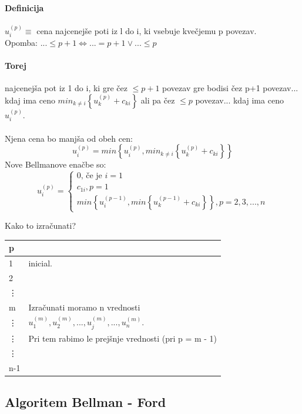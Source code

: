 \documentclass[a4paper,10pt]{article}
\begin{document}
\paragraph{Definicija}
$u_i^{(p)} \equiv$ cena najcenej\v se poti iz l do i, ki vsebuje kve\v cjemu p povezav.\\
Opomba: $... \leq p + 1 \Leftrightarrow ...= p + 1 \vee ... \leq p$

\paragraph{Torej} najcenej\v sa pot iz 1 do i, ki gre \v cez $\leq p + 1$ povezav gre bodisi \v cez p+1 povezav... kdaj ima ceno $min_{k \neq i} \left\lbrace u_k^{(p)} + c_{ki} \right\rbrace$ ali pa \v cez $\leq p$ povezav... kdaj ima ceno $u_i^{(p)}$.\\
\\
Njena cena bo manj\v sa od obeh cen:
$$
u_i^{(p)} = min \left\lbrace u_i^{(p)}, min_{k \neq i}\left\lbrace  u_k^{(p)} + c_{ki} \right\rbrace \right\rbrace 
$$
Nove Bellmanove ena\v cbe so:
$$
u_i^{(p)} = \left\lbrace 
\begin{array}{l}
0 \mbox{, \v ce je } i = 1 \\
c_{1i}, p = 1 \\
min\left\lbrace u_i^{(p-1)}, min\left\lbrace u_k^{(p-1)} + c_{ki} \right\rbrace \right\rbrace , p=2, 3,..., n
\end{array}
\right. 
$$

Kako to izra\v cunati? \\

\begin{tabular}{l|l}
p & \\\hline
1 & inicial. \\
2 & \\
\vdots & \\
m & Izra\v cunati moramo n vrednosti \\
\vdots & $u_1^{(m)}, u_2^{(m)},..., u_j^{(m)},..., u_n^{(m)}$. \\
\vdots & Pri tem rabimo le prej\v snje vrednosti (pri p = m - 1) \\
\vdots & \\
n-1 & \\
\end{tabular}

\subsection{Algoritem Bellman - Ford}
\end{document}
